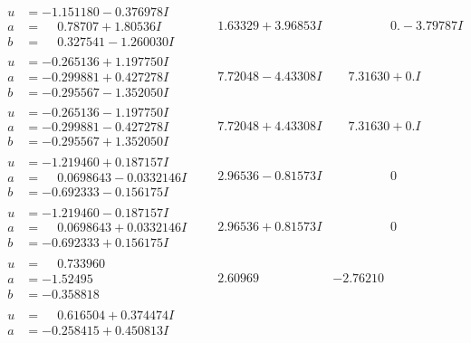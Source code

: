 \documentclass[1p]{elsarticle_modified}
\theoremstyle{definition}
\begin{document}
$$\begin{array}{c|c|c}
\begin{aligned}
u &= -1.151180 - 0.376978 I \\
a &= \phantom{-}0.78707 + 1.80536 I \\
b &= \phantom{-}0.327541 - 1.260030 I\end{aligned}
 & \phantom{-}1.63329 + 3.96853 I & \phantom{-0.000000 } 0. - 3.79787 I \\ \hline\begin{aligned}
u &= -0.265136 + 1.197750 I \\
a &= -0.299881 + 0.427278 I \\
b &= -0.295567 - 1.352050 I\end{aligned}
 & \phantom{-}7.72048 - 4.43308 I & \phantom{-}7.31630 + 0. I\phantom{ +0.000000I} \\ \hline\begin{aligned}
u &= -0.265136 - 1.197750 I \\
a &= -0.299881 - 0.427278 I \\
b &= -0.295567 + 1.352050 I\end{aligned}
 & \phantom{-}7.72048 + 4.43308 I & \phantom{-}7.31630 + 0. I\phantom{ +0.000000I} \\ \hline\begin{aligned}
u &= -1.219460 + 0.187157 I \\
a &= \phantom{-}0.0698643 - 0.0332146 I \\
b &= -0.692333 - 0.156175 I\end{aligned}
 & \phantom{-}2.96536 - 0.81573 I & \phantom{-0.000000 } 0 \\ \hline\begin{aligned}
u &= -1.219460 - 0.187157 I \\
a &= \phantom{-}0.0698643 + 0.0332146 I \\
b &= -0.692333 + 0.156175 I\end{aligned}
 & \phantom{-}2.96536 + 0.81573 I & \phantom{-0.000000 } 0 \\ \hline\begin{aligned}
u &= \phantom{-}0.733960\phantom{ +0.000000I} \\
a &= -1.52495\phantom{ +0.000000I} \\
b &= -0.358818\phantom{ +0.000000I}\end{aligned}
 & \phantom{-}2.60969\phantom{ +0.000000I} & -2.76210\phantom{ +0.000000I} \\ \hline\begin{aligned}
u &= \phantom{-}0.616504 + 0.374474 I \\
a &= -0.258415 + 0.450813 I \\

\end{aligned}
\end{array}$$
\end{document}
